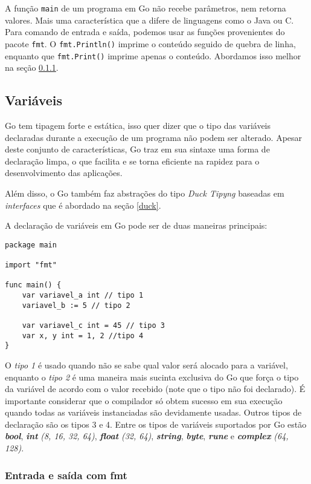 \documentclass{SBCbookchapter}
\begin{document}
A função \texttt{main} de um programa em Go não recebe parâmetros, nem retorna valores. Mais uma característica que a difere de linguagens como o Java ou C.
Para comando de entrada e saída, podemos usar as funções provenientes do pacote \texttt{fmt}. O \texttt{fmt.Println()} imprime o conteúdo seguido de quebra de linha, enquanto que \texttt{fmt.Print()} imprime apenas o conteúdo. Abordamos isso melhor na seção \ref{secaodeio}.

\subsection{Variáveis}

Go tem tipagem forte e estática, isso quer dizer que o tipo das variáveis declaradas durante a execução de um programa não podem ser alterado. Apesar deste conjunto de características, Go traz em sua sintaxe uma forma de declaração limpa, o que facilita e se torna eficiente na rapidez para o desenvolvimento das aplicações.

Além disso, o Go também faz abstrações do tipo \textit{Duck Tipyng} baseadas em \textit{interfaces} que é abordado na seção \ref{duck}.

A declaração de variáveis em Go pode ser de duas maneiras principais:

\begin{lstlisting}
package main

import "fmt"

func main() {
	var variavel_a int // tipo 1
	variavel_b := 5 // tipo 2
	
	var variavel_c int = 45 // tipo 3
	var x, y int = 1, 2 //tipo 4
}
\end{lstlisting}

O \textit{tipo 1} é usado quando não se sabe qual valor será alocado para a variável, enquanto o \textit{tipo 2} é uma maneira mais sucinta exclusiva do Go que força o tipo da variável de acordo com o valor recebido (note que o tipo não foi declarado). É importante considerar que o compilador só obtem sucesso em sua execução quando todas as variáveis instanciadas são devidamente usadas. Outros tipos de declaração são os tipos 3 e 4. Entre os tipos de variáveis suportados por Go estão \textbf{\textit{bool}}, \textbf{\textit{int}} \textit{(8, 16, 32, 64)}, \textbf{\textit{float}} \textit{(32, 64)}, \textbf{\textit{string}}, \textbf{\textit{byte}}, \textbf{\textit{rune}} e \textbf{\textit{complex}} \textit{(64, 128)}.

\subsubsection{Entrada e saída com fmt}
\label{secaodeio}
\end{document}
